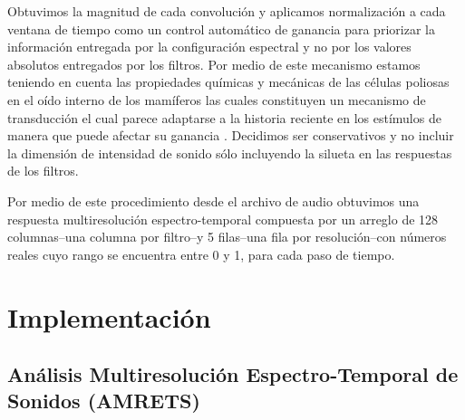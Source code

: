 Obtuvimos la magnitud de cada convolución y aplicamos normalización a cada ventana de tiempo como un control automático de ganancia para priorizar la información entregada por la configuración espectral y no por los valores absolutos entregados por los filtros. Por medio de este mecanismo estamos teniendo en cuenta las propiedades químicas y mecánicas de las células poliosas en el oído interno de los mamíferos las cuales constituyen un mecanismo de transducción el cual parece adaptarse a la historia reciente en los estímulos de manera que puede afectar su ganancia \cite{eatock_2000,holt_2000,le_goff_2005}. Decidimos ser conservativos y no incluir la dimensión de intensidad de sonido sólo incluyendo la silueta en las respuestas de los filtros. 


Por medio de este procedimiento desde el archivo de audio obtuvimos una respuesta multiresolución espectro-temporal compuesta por un arreglo de 128 columnas--una columna por filtro--y 5 filas--una fila por resolución--con números reales cuyo rango se encuentra entre 0 y 1, para cada paso de tiempo.





\section{Implementación}

\subsection{Análisis Multiresolución Espectro-Temporal de Sonidos (AMRETS)}

